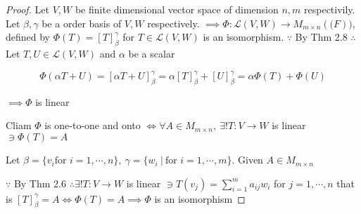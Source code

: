 \begin{proof}
	Let $V,W$ be finite dimensional vector space of dimension $n,m$ respectivily. Let $\beta, \gamma$ be a order basis of $V,W$ respectively. $\implies \Phi: \mathscr{L}(V,W) \rightarrow M_{m \times n}(\mathrm(F))$, defined by $\Phi (T) = [T]^{\gamma}_{\beta}$ for $T \in \mathscr{L}(V,W)$ is an isomorphism. $\because$ By Thm 2.8 $\therefore$ Let $T,U \in \mathscr{L}(V,W)$ and $\alpha $ be a scalar
	
	$$\Phi (\alpha T + U) = [\alpha T + U]^{\gamma}_{\beta} = \alpha [T]^{\gamma}_{\beta} + [U]^{\gamma}_{\beta} = \alpha \Phi (T) + \Phi (U)$$
	
	$\implies \Phi$ is linear
	
	Cliam $\Phi$ is one-to-one and onto $\Leftrightarrow \forall A \in M_{m \times n},~ \exists ! T:V\rightarrow W$ is linear $\ni \Phi(T) = A$
	
	Let $\beta = \{v_i \text{for } i = 1,\cdots,n\},~\gamma = \{w_i ~|~ \text{for } i = 1,\cdots,m\}$. Given $A \in M_{m \times n}$
	
	$\because$ By Thm 2.6 $\therefore \exists ! T: V \rightarrow W$ is linear $\ni T(v_j) = \sum^{m}_{i=1}a_{ij}w_i$ for $j = 1,\cdots,n$ that is $[T]^{\gamma}_{\beta} = A \Leftrightarrow \Phi(T) = A \implies \Phi$ is an isomorphism
\end{proof}
